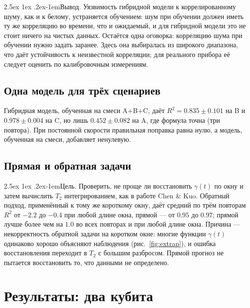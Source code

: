 \documentclass[12pt,a4paper]{report}
\makeatletter
\renewcommand\paragraph{\@startsection{paragraph}{4}{\z@}%
  {2.5ex \@plus1ex \@minus.2ex}{-1em}{\normalfont\normalsize\bfseries}}
\numberwithin{equation}{chapter}
\makeatother
\begin{document}
\paragraph{Вывод.} Уязвимость гибридной модели к коррелированному шуму,
как и к белому, устраняется обучением: шум при обучении должен иметь ту же
корреляцию во времени, что и ожидаемый, и для гибридной модели это не
стоит ничего на чистых данных. Остаётся одна оговорка: корреляцию шума при
обучении нужно задать заранее. Здесь она выбиралась из широкого диапазона,
что даёт устойчивость к неизвестной корреляции; для реального прибора её
следует оценить по калибровочным измерениям.

\section{Одна модель для трёх сценариев}

Гибридная модель, обученная на смеси A$+$B$+$C, даёт $R^2=0.835\pm0.101$
на B и $0.978\pm0.004$ на C, но лишь $0.452\pm0.082$ на A, где формула точна
(три повтора).
При постоянной скорости правильная поправка равна нулю, а модель, обученная
на смеси, добавляет ненулевую.

\section{Прямая и обратная задачи}
\label{sec:e5}

\paragraph{Цель.} Проверить, не проще ли восстановить $\gamma(t)$ по окну и
затем вычислить $T_2$ интегрированием, как в работе Chen \& Kuo. Обратный
подход, применённый к тому же короткому окну, даёт средний по трём
повторам $R^2$ от $-2.2$ до $-0.4$ при любой длине окна, прямой --- от $0.95$
до $0.97$; прямой лучше более чем на $1.0$ во всех повторах и при любой
длине окна.
Причина --- некорректность обратной задачи на коротком окне: многие функции
$\gamma(t)$ одинаково хорошо объясняют наблюдения (рис.~\ref{fig:extrap}), и
ошибка восстановления переходит в $T_2$ с большим разбросом. Прямой прогноз не
пытается восстановить то, что данными не определено.

\chapter{Результаты: два кубита}
\label{chap:res2}
\end{document}
